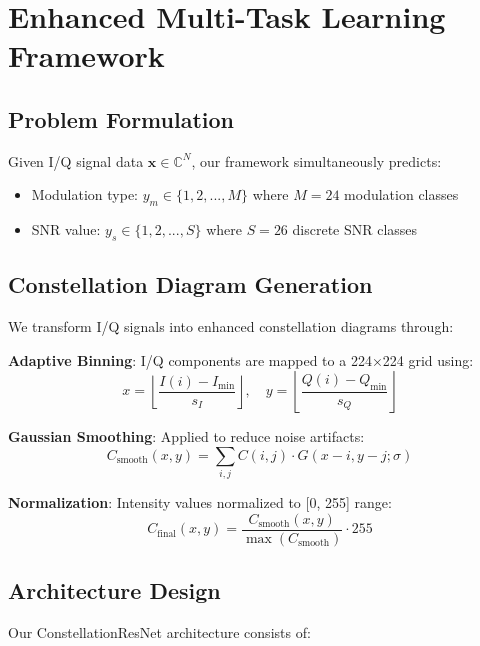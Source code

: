 \documentclass[conference]{IEEEtran}
\begin{document}
\section{Enhanced Multi-Task Learning Framework}

\subsection{Problem Formulation}

Given I/Q signal data $\mathbf{x} \in \mathbb{C}^N$, our framework simultaneously predicts:
\begin{itemize}
\item Modulation type: $y_m \in \{1, 2, ..., M\}$ where $M=24$ modulation classes
\item SNR value: $y_s \in \{1, 2, ..., S\}$ where $S=26$ discrete SNR classes
\end{itemize}

\subsection{Constellation Diagram Generation}

We transform I/Q signals into enhanced constellation diagrams through:

\textbf{Adaptive Binning}: I/Q components are mapped to a 224×224 grid using:
\begin{equation}
x = \left\lfloor \frac{I(i) - I_{\min}}{s_I} \right\rfloor, \quad y = \left\lfloor \frac{Q(i) - Q_{\min}}{s_Q} \right\rfloor
\end{equation}

\textbf{Gaussian Smoothing}: Applied to reduce noise artifacts:
\begin{equation}
C_{\text{smooth}}(x,y) = \sum_{i,j} C(i,j) \cdot G(x-i, y-j; \sigma)
\end{equation}

\textbf{Normalization}: Intensity values normalized to [0, 255] range:
\begin{equation}
C_{\text{final}}(x,y) = \frac{C_{\text{smooth}}(x,y)}{\max(C_{\text{smooth}})} \cdot 255
\end{equation}

\subsection{Architecture Design}

Our ConstellationResNet architecture consists of:
\end{document}
